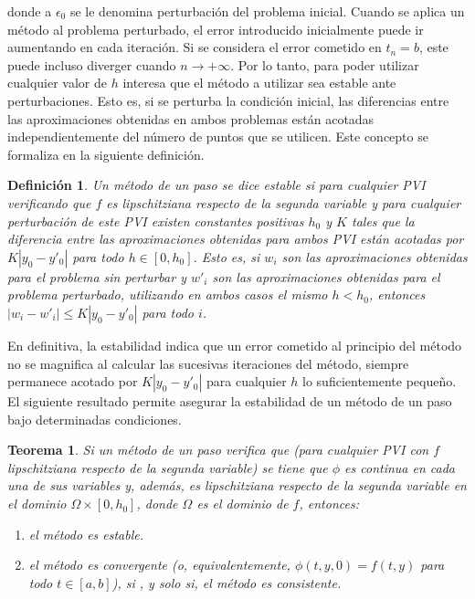 \documentclass{article}
\theoremstyle{theorem-style}  %
\newtheorem{theorem}{Teorema}[section]  %
\theoremstyle{definition-style}
\newtheorem{definition}{Definición}[section]
\theoremstyle{example-style}
\begin{document}
donde a $\epsilon_0$ se le denomina perturbación del problema inicial. Cuando se aplica un método al problema perturbado, el error introducido inicialmente puede ir aumentando en cada iteración. Si se considera el error cometido en $t_n = b$, este puede incluso diverger cuando $n \rightarrow +\infty$. Por lo tanto, para poder utilizar cualquier valor de $h$ interesa que el método a utilizar sea estable ante perturbaciones. Esto es, si se perturba la condición inicial, las diferencias entre las aproximaciones obtenidas en ambos problemas están acotadas independientemente del número de puntos que se utilicen. Este concepto se formaliza en la siguiente definición.

	\begin{definition}
		Un método de un paso se dice estable si para cualquier PVI verificando que $f$ es lipschitziana respecto de la segunda variable y para cualquier perturbación de este PVI existen constantes positivas $h_0$ y $K$ tales que la diferencia entre las aproximaciones obtenidas para ambos PVI están acotadas por $K |y_0 - y'_0|$ para todo $h \in [0,h_0]$. Esto es, si $w_i$ son las aproximaciones obtenidas para el problema sin perturbar y $w'_i$ son las aproximaciones obtenidas para el problema perturbado, utilizando en ambos casos el mismo $h < h_0$, entonces $\left|w_i - w'_i\right| \le K |y_0 - y'_0|$ para todo $i$.
	\end{definition}

	En definitiva, la estabilidad indica que un error cometido al principio del método no se magnifica al calcular las sucesivas iteraciones del método, siempre permanece acotado por $K |y_0 - y'_0|$ para cualquier $h$ lo suficientemente pequeño. El siguiente resultado permite asegurar la estabilidad de un método de un paso bajo determinadas condiciones.

	\begin{theorem} \label{theorem:stability}
		Si un método de un paso verifica que (para cualquier PVI con $f$ lipschitziana respecto de la segunda variable) se tiene que $\phi$ es continua en cada una de sus variables y, además, es lipschitziana respecto de la segunda variable en el dominio $\Omega \times [0, h_0]$, donde $\Omega$ es el dominio de $f$, entonces:
		\begin{enumerate}
			\item el método es estable.
			\item el método es convergente (o, equivalentemente, $\phi(t,y,0) = f(t,y)$ para todo $t \in [a,b]$), si , y solo si, el método es consistente.
		\end{enumerate}
	\end{theorem}
\end{document}
